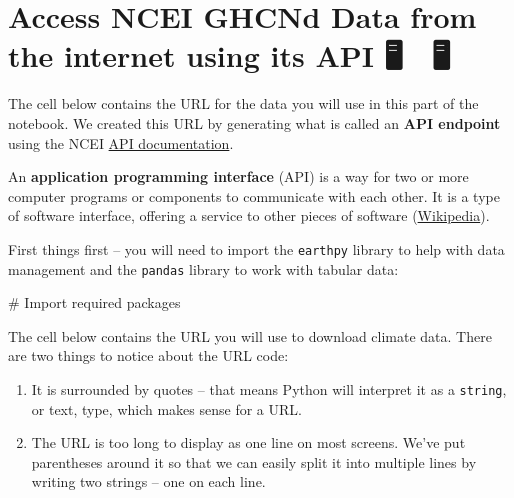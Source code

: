 \documentclass[
  letterpaper,
  DIV=11,
  numbers=noendperiod,
  oneside]{scrreprt}
\newenvironment{Shaded}{\begin{snugshade}}{\end{snugshade}}
\newcommand{\CommentTok}[1]{\textcolor[rgb]{0.37,0.37,0.37}{#1}}
\providecommand{\tightlist}{%
  \setlength{\itemsep}{0pt}\setlength{\parskip}{0pt}}
\begin{document}
\section{Access NCEI GHCNd Data from the internet using its API 🖥️ 📡
🖥️}\label{access-ncei-ghcnd-data-from-the-internet-using-its-api-1}

The cell below contains the URL for the data you will use in this part
of the notebook. We created this URL by generating what is called an
\textbf{API endpoint} using the NCEI
\href{https://www.ncei.noaa.gov/support/access-data-service-api-user-documentation}{API
documentation}.

\begin{tcolorbox}[enhanced jigsaw, colbacktitle=quarto-callout-note-color!10!white, opacityback=0, bottomtitle=1mm, toptitle=1mm, bottomrule=.15mm, left=2mm, colframe=quarto-callout-note-color-frame, leftrule=.75mm, opacitybacktitle=0.6, colback=white, rightrule=.15mm, toprule=.15mm, breakable, titlerule=0mm, title=\textcolor{quarto-callout-note-color}{\faInfo}\hspace{0.5em}{What's an API?}, coltitle=black, arc=.35mm]

An \textbf{application programming interface} (API) is a way for two or
more computer programs or components to communicate with each other. It
is a type of software interface, offering a service to other pieces of
software (\href{https://en.wikipedia.org/wiki/API}{Wikipedia}).

\end{tcolorbox}

First things first -- you will need to import the \texttt{earthpy}
library to help with data management and the \texttt{pandas} library to
work with tabular data:

\begin{Shaded}
\begin{Highlighting}[]
\CommentTok{\# Import required packages}
\end{Highlighting}
\end{Shaded}

The cell below contains the URL you will use to download climate data.
There are two things to notice about the URL code:

\begin{enumerate}
\def\labelenumi{\arabic{enumi}.}
\tightlist
\item
  It is surrounded by quotes -- that means Python will interpret it as a
  \texttt{string}, or text, type, which makes sense for a URL.
\item
  The URL is too long to display as one line on most screens. We've put
  parentheses around it so that we can easily split it into multiple
  lines by writing two strings -- one on each line.
\end{enumerate}
\end{document}
